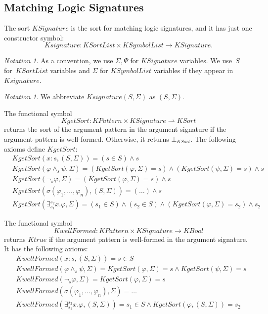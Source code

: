 \documentclass[UTF8]{article}
\newcounter{thmcounter}
\theoremstyle{plain}
\theoremstyle{definition}
\theoremstyle{remark}
\newtheorem{notation}[thmcounter]{Notation}
\newcommand{\cln}{{:}}
\newcommand{\KBool}{\mathit{KBool}}
\newcommand{\Ktrue}{\mathit{Ktrue}}
\newcommand{\KSort}{\mathit{KSort}}
\newcommand{\KSortList}{\mathit{KSortList}}
\newcommand{\KSymbolList}{\mathit{KSymbolList}}
\newcommand{\KPattern}{\mathit{KPattern}}
\newcommand{\kand}{\wedge}
\newcommand{\knot}{\neg}
\newcommand{\kexists}{\exists}
\newcommand{\KSignature}{\mathit{KSignature}}
\newcommand{\Ksignature}{\mathit{Ksignature}}
\newcommand{\KwellFormed}{\mathit{KwellFormed}}
\newcommand{\KgetSort}{\mathit{KgetSort}}
\begin{document}
\subsection{Matching Logic Signatures}

The sort $\KSignature$ is the sort for matching logic signatures, and it has just one constructor symbol:
\begin{equation*}
\Ksignature \colon \KSortList \times \KSymbolList \to \KSignature.
\end{equation*}

\begin{notation}
	As a convention, we use $\Sigma, \Psi$ for $\KSignature$ variables. 
	We use~$S$ for~$\KSortList$ variables and $\Sigma$ for $\KSymbolList$ variables if they appear in~$\Ksignature$. 
\end{notation}

\begin{notation}
	We abbreviate $\Ksignature(S, \Sigma)$ as $(S, \Sigma)$.
\end{notation}

The functional symbol
$$\KgetSort \colon \KPattern \times \KSignature \rightharpoonup \KSort$$
returns the sort of the argument pattern in the argument signature if the argument pattern is well-formed.
Otherwise, it returns $\bot_\KSort$.
The following axioms define $\KgetSort$:
\begin{align*}
&\KgetSort(x \cln s, (S, \Sigma)) = (s \in S) \wedge s
\\
&\KgetSort(\varphi \kand_s \psi, \Sigma) = (\KgetSort(\varphi, \Sigma) = s) \wedge (\KgetSort(\psi, \Sigma) = s) \wedge s
\\
&\KgetSort(\knot_s \varphi, \Sigma) = (\KgetSort(\varphi, \Sigma) = s) \wedge s
\\
&\KgetSort(\sigma(\varphi_1,\dots,\varphi_n), (S, \Sigma)) = (\dots) \wedge s
\\
&\KgetSort(\kexists_{s_1}^{s_2} x . \varphi, \Sigma) = (s_1 \in S) \wedge (s_2 \in S) \wedge (\KgetSort(\varphi, \Sigma) = s_2) \wedge s_2
\end{align*}

The functional symbol 
$$\KwellFormed \colon \KPattern \times \KSignature \to \KBool$$ returns $\Ktrue$ if the argument pattern is well-formed in the argument signature.
It has the following axioms:
\begin{align*}
&\KwellFormed(x \cln s, (S, \Sigma)) = s \in S
\\
&\KwellFormed(\varphi \kand_s \psi, \Sigma) = \KgetSort(\varphi, \Sigma) = s \wedge \KgetSort(\psi, \Sigma) = s
\\
&\KwellFormed(\knot_s \varphi, \Sigma) = \KgetSort(\varphi, \Sigma) = s
\\
&\KwellFormed(\sigma(\varphi_1, \dots, \varphi_n), \Sigma) = \dots
\\
&\KwellFormed(\kexists_{s_1}^{s_2} x . \varphi, (S, \Sigma)) = s_1 \in S \wedge \KgetSort(\varphi, (S, \Sigma)) = s_2
\end{align*}
\end{document}
